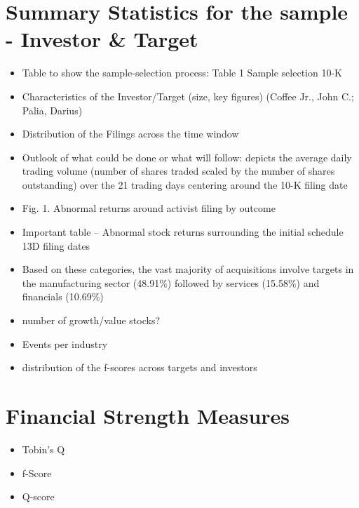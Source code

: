\documentclass[12pt]{article}
\begin{document}
\section{Summary Statistics for the sample - Investor \& Target}

    \begin{itemize}

        \item Table to show the sample-selection process: Table 1 Sample selection 10-K \citep{You2009}

        \item Characteristics of the Investor/Target (size, key figures) (Coffee Jr., John C.; Palia, Darius)

        \item Distribution of the Filings across the time window

        \item Outlook of what could be done or what will follow: depicts the average daily trading volume (number of shares traded scaled by the number of shares outstanding) over the 21 trading days centering around the 10-K filing date \citep{You2009}

        \item Fig. 1. Abnormal returns around activist filing by outcome \citep[p. 370]{Greenwood2009}

        \item Important table -- Abnormal stock returns surrounding the initial schedule 13D filing dates \citep{Klein2009}

        \item Based on these categories, the vast majority of acquisitions involve targets in the manufacturing sector (48.91\%) followed by services (15.58\%) and financials (10.69\%) \citep{Akhigbe2007}

        \item number of growth/value stocks? 

        \item Events per industry

        \item distribution of the f-scores across targets and investors

    \end{itemize}
\section{Financial Strength Measures}

\begin{itemize}
    \item Tobin's Q
    \item f-Score
    \item Q-score
\end{itemize}
\end{document}
